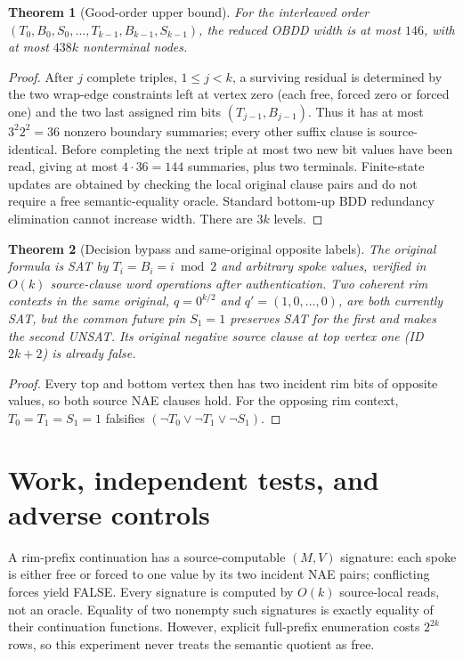 \documentclass[11pt]{article}
\newtheorem{theorem}{Theorem}
\begin{document}
\begin{theorem}[Good-order upper bound]
For the interleaved order $(T_0,B_0,S_0,\ldots,T_{k-1},B_{k-1},S_{k-1})$, the reduced OBDD width is at most $146$, with at most $438k$ nonterminal nodes.
\end{theorem}
\begin{proof}
After $j$ complete triples, $1\le j<k$, a surviving residual is determined by the two wrap-edge constraints left at vertex zero (each free, forced zero or forced one) and the two last assigned rim bits $(T_{j-1},B_{j-1})$. Thus it has at most $3^2 2^2=36$ nonzero boundary summaries; every other suffix clause is source-identical. Before completing the next triple at most two new bit values have been read, giving at most $4\cdot36=144$ summaries, plus two terminals. Finite-state updates are obtained by checking the local original clause pairs and do not require a free semantic-equality oracle. Standard bottom-up BDD redundancy elimination cannot increase width. There are $3k$ levels.
\end{proof}

\begin{theorem}[Decision bypass and same-original opposite labels]
The original formula is SAT by $T_i=B_i=i\bmod2$ and arbitrary spoke values, verified in $O(k)$ source-clause word operations after authentication. Two coherent rim contexts in the \emph{same original}, $q=0^{k/2}$ and $q'=(1,0,\ldots,0)$, are both currently SAT, but the common future pin $S_1=1$ preserves SAT for the first and makes the second UNSAT. Its original negative source clause at top vertex one (ID $2k+2$) is already false.
\end{theorem}
\begin{proof}
Every top and bottom vertex then has two incident rim bits of opposite values, so both source NAE clauses hold. For the opposing rim context, $T_0=T_1=S_1=1$ falsifies $(\neg T_0\lor\neg T_1\lor\neg S_1)$.
\end{proof}

\section{Work, independent tests, and adverse controls}
A rim-prefix continuation has a source-computable $(M,V)$ signature: each spoke is either free or forced to one value by its two incident NAE pairs; conflicting forces yield FALSE. Every signature is computed by $O(k)$ source-local reads, not an oracle. Equality of two nonempty such signatures is exactly equality of their continuation functions. However, explicit full-prefix enumeration costs $2^{2k}$ rows, so this experiment never treats the semantic quotient as free.
\end{document}
